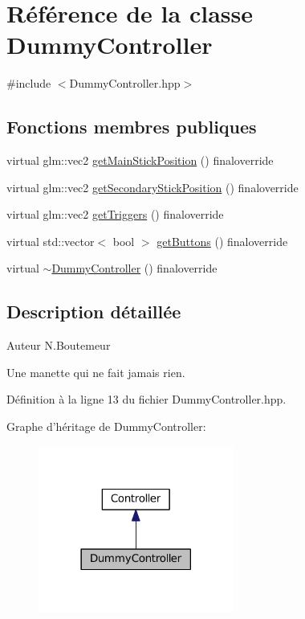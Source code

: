 \hypertarget{structDummyController}{\section{Référence de la classe Dummy\+Controller}
\label{structDummyController}
}


{\ttfamily \#include $<$Dummy\+Controller.\+hpp$>$}

\subsection*{Fonctions membres publiques}
\begin{DoxyCompactItemize}
\item 
virtual glm\+::vec2 \hyperlink{structDummyController_a0f91702b184d73e7c5e1e9a54cee1f48}{get\+Main\+Stick\+Position} () finaloverride
\item 
virtual glm\+::vec2 \hyperlink{structDummyController_a9475640a5f1678c556c718c1cc84b589}{get\+Secondary\+Stick\+Position} () finaloverride
\item 
virtual glm\+::vec2 \hyperlink{structDummyController_af8f0e6203fbc4204195c72a5675c981e}{get\+Triggers} () finaloverride
\item 
virtual std\+::vector$<$ bool $>$ \hyperlink{structDummyController_af19894dd92abd6a975f48759c524c232}{get\+Buttons} () finaloverride
\item 
virtual \hyperlink{structDummyController_a0b2f85a21ef6b0f95d608f8951541613}{$\sim$\+Dummy\+Controller} () finaloverride
\end{DoxyCompactItemize}


\subsection{Description détaillée}
\begin{DoxyAuthor}{Auteur}
N.\+Boutemeur
\end{DoxyAuthor}
Une manette qui ne fait jamais rien. 

Définition à la ligne 13 du fichier Dummy\+Controller.\+hpp.



Graphe d'héritage de Dummy\+Controller\+:
\nopagebreak
\begin{figure}[H]
\begin{center}
\leavevmode
\includegraphics[width=182pt]{structDummyController__inherit__graph}
\end{center}
\end{figure}


